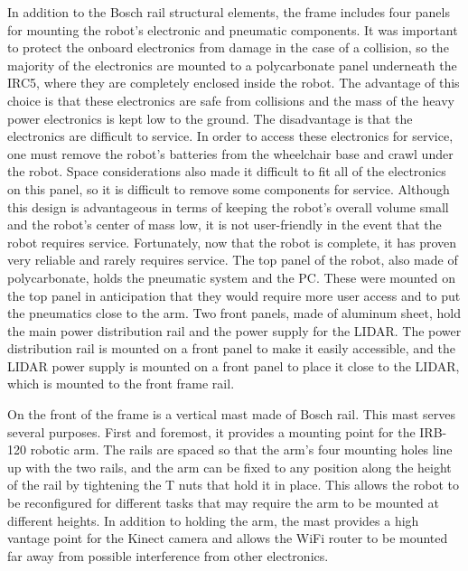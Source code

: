 \documentclass{cwru}
\begin{document}
In addition to the Bosch rail structural elements, the frame includes four panels for mounting the robot{\textquoteright}s electronic and pneumatic components. It was important to protect the onboard electronics from damage in the case of a collision, so the majority of the electronics are mounted to a polycarbonate panel underneath the IRC5, where they are completely enclosed inside the robot. The advantage of this choice is that these electronics are safe from collisions and the mass of the heavy power electronics is kept low to the ground. The disadvantage is that the electronics are difficult to service. In order to access these electronics for service, one must remove the robot{\textquoteright}s batteries from the wheelchair base and crawl under the robot. Space considerations also made it difficult to fit all of the electronics on this panel, so it is difficult to remove some components for service. Although this design is advantageous in terms of keeping the robot{\textquoteright}s overall volume small and the robot{\textquoteright}s center of mass low, it is not user-friendly in the event that the robot requires service. Fortunately, now that the robot is complete, it has proven very reliable and rarely requires service. The top panel of the robot, also made of polycarbonate, holds the pneumatic system and the PC. These were mounted on the top panel in anticipation that they would require more user access and to put the pneumatics close to the arm. Two front panels, made of aluminum sheet, hold the main power distribution rail and the power supply for the LIDAR. The power distribution rail is mounted on a front panel to make it easily accessible, and the LIDAR power supply is mounted on a front panel to place it close to the LIDAR, which is mounted to the front frame rail.

On the front of the frame is a vertical mast made of Bosch rail. This mast serves several purposes. First and foremost, it provides a mounting point for the IRB-120 robotic arm. The rails are spaced so that the arm{\textquoteright}s four mounting holes line up with the two rails, and the arm can be fixed to any position along the height of the rail by tightening the T nuts that hold it in place. This allows the robot to be reconfigured for different tasks that may require the arm to be mounted at different heights. In addition to holding the arm, the mast provides a high vantage point for the Kinect camera and allows the WiFi router to be mounted far away from possible interference from other electronics.
\end{document}

